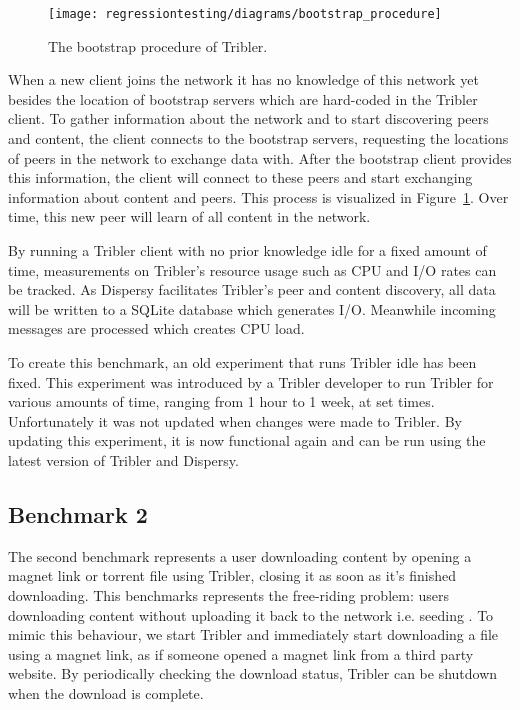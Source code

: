 \begin{figure}[!h]
	\centering
	\texttt{[image: regressiontesting/diagrams/bootstrap\_procedure]}
	\caption{The bootstrap procedure of Tribler.}
	\label{fig:tribler_bootstrapping}
\end{figure}

When a new client joins the network it has no knowledge of this network yet besides the location of bootstrap servers which are hard-coded in the Tribler client.
To gather information about the network and to start discovering peers and content, the client connects to the bootstrap servers, requesting the locations of peers in the network to exchange data with.
After the bootstrap client provides this information, the client will connect to these peers and start exchanging information about content and peers.
This process is visualized in Figure~\ref{fig:tribler_bootstrapping}.
Over time, this new peer will learn of all content in the network.

By running a Tribler client with no prior knowledge idle for a fixed amount of time, measurements on Tribler's resource usage such as CPU and I/O rates can be tracked.
As Dispersy facilitates Tribler's peer and content discovery, all data will be written to a SQLite database which generates I/O.
Meanwhile incoming messages are processed which creates CPU load.

To create this benchmark, an old experiment that runs Tribler idle has been fixed.
This experiment was introduced by a Tribler developer to run Tribler for various amounts of time, ranging from 1 hour to 1 week, at set times.
Unfortunately it was not updated when changes were made to Tribler.
By updating this experiment, it is now functional again and can be run using the latest version of Tribler and Dispersy.

\subsection{Benchmark 2}

The second benchmark represents a user downloading content by opening a magnet link or torrent file using Tribler, closing it as soon as it's finished downloading.
This benchmarks represents the free-riding problem: users downloading content without uploading it back to the network i.e. seeding \cite{adar2000free}.
To mimic this behaviour, we start Tribler and immediately start downloading a file using a magnet link, as if someone opened a magnet link from a third party website.
By periodically checking the download status, Tribler can be shutdown when the download is complete.

